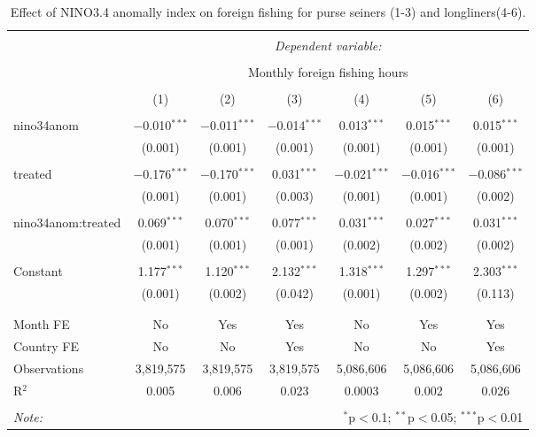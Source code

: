 
\begin{table}[!htbp] \centering 
  \caption{\label{tab:ff_reg}Effect of NINO3.4 anomally index on foreign fishing for purse seiners (1-3) and longliners(4-6).} 
  \label{} 
\begin{tabular}{@{\extracolsep{5pt}}lcccccc} 
\\[-1.8ex]\hline 
\hline \\[-1.8ex] 
 & \multicolumn{6}{c}{\textit{Dependent variable:}} \\ 
\cline{2-7} 
\\[-1.8ex] & \multicolumn{6}{c}{Monthly foreign fishing hours} \\ 
\\[-1.8ex] & (1) & (2) & (3) & (4) & (5) & (6)\\ 
\hline \\[-1.8ex] 
 nino34anom & $-$0.010$^{***}$ & $-$0.011$^{***}$ & $-$0.014$^{***}$ & 0.013$^{***}$ & 0.015$^{***}$ & 0.015$^{***}$ \\ 
  & (0.001) & (0.001) & (0.001) & (0.001) & (0.001) & (0.001) \\ 
  & & & & & & \\ 
 treated & $-$0.176$^{***}$ & $-$0.170$^{***}$ & 0.031$^{***}$ & $-$0.021$^{***}$ & $-$0.016$^{***}$ & $-$0.086$^{***}$ \\ 
  & (0.001) & (0.001) & (0.003) & (0.001) & (0.001) & (0.002) \\ 
  & & & & & & \\ 
 nino34anom:treated & 0.069$^{***}$ & 0.070$^{***}$ & 0.077$^{***}$ & 0.031$^{***}$ & 0.027$^{***}$ & 0.031$^{***}$ \\ 
  & (0.001) & (0.001) & (0.001) & (0.002) & (0.002) & (0.002) \\ 
  & & & & & & \\ 
 Constant & 1.177$^{***}$ & 1.120$^{***}$ & 2.132$^{***}$ & 1.318$^{***}$ & 1.297$^{***}$ & 2.303$^{***}$ \\ 
  & (0.001) & (0.002) & (0.042) & (0.001) & (0.002) & (0.113) \\ 
  & & & & & & \\ 
\hline \\[-1.8ex] 
Month FE & No & Yes & Yes & No & Yes & Yes \\ 
Country FE & No & No & Yes & No & No & Yes \\ 
Observations & 3,819,575 & 3,819,575 & 3,819,575 & 5,086,606 & 5,086,606 & 5,086,606 \\ 
R$^{2}$ & 0.005 & 0.006 & 0.023 & 0.0003 & 0.002 & 0.026 \\ 
\hline 
\hline \\[-1.8ex] 
\textit{Note:}  & \multicolumn{6}{r}{$^{*}$p$<$0.1; $^{**}$p$<$0.05; $^{***}$p$<$0.01} \\ 
\end{tabular} 
\end{table} 

